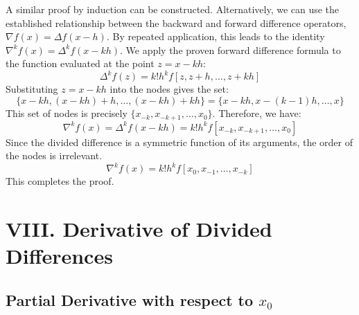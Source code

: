 \documentclass[a4paper]{article}
\begin{document}
A similar proof by induction can be constructed. Alternatively, we can use the established relationship between the backward and forward difference operators, $\nabla f(x) = \Delta f(x-h)$.
By repeated application, this leads to the identity $\nabla^k f(x) = \Delta^k f(x-kh)$.
We apply the proven forward difference formula to the function evaluated at the point $z = x-kh$:
\[
\Delta^k f(z) = k!h^k f[z, z+h, \dots, z+kh]
\]
Substituting $z=x-kh$ into the nodes gives the set:
\[
\{x-kh, (x-kh)+h, \dots, (x-kh)+kh\} = \{x-kh, x-(k-1)h, \dots, x\}
\]
This set of nodes is precisely $\{x_{-k}, x_{-k+1}, \dots, x_0\}$.
Therefore, we have:
\[
\nabla^k f(x) = \Delta^k f(x-kh) = k!h^k f[x_{-k}, x_{-k+1}, \dots, x_0]
\]
Since the divided difference is a symmetric function of its arguments, the order of the nodes is irrelevant.
\[
\nabla^k f(x) = k!h^k f[x_0, x_{-1}, \dots, x_{-k}]
\]
This completes the proof.



\section*{VIII. Derivative of Divided Differences}

\subsection*{Partial Derivative with respect to $x_0$}
\end{document}
